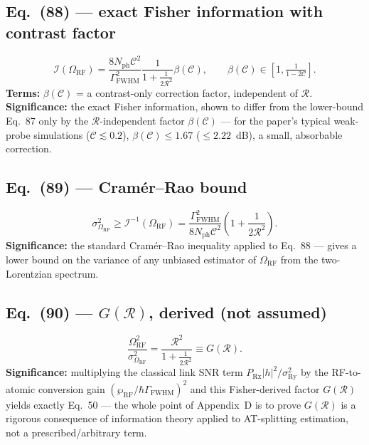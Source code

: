 \documentclass[11pt]{article}
\begin{document}
\subsection*{Eq.~(88) --- exact Fisher information with contrast factor}
\begin{equation}
\mathcal I(\Omega_\text{RF}) = \frac{8N_\text{ph}\mathcal C^2}{\Gamma_\text{FWHM}^2}\frac{1}{1+\frac{1}{2\mathcal R^2}}\beta(\mathcal C), \qquad \beta(\mathcal C)\in\left[1,\tfrac{1}{1-2\mathcal C}\right]. \tag{88}
\end{equation}
\textbf{Terms:} $\beta(\mathcal C)$ = a contrast-only correction factor,
independent of $\mathcal R$.
\textbf{Significance:} the exact Fisher information, shown to differ
from the lower-bound Eq.~87 only by the $\mathcal R$-independent factor
$\beta(\mathcal C)$ --- for the paper's typical weak-probe simulations
($\mathcal C\lesssim0.2$), $\beta(\mathcal C)\le1.67$ ($\le2.22$~dB), a
small, absorbable correction.

\subsection*{Eq.~(89) --- Cram\'er--Rao bound}
\begin{equation}
\sigma_{\Omega_\text{RF}}^2 \ge \mathcal I^{-1}(\Omega_\text{RF}) = \frac{\Gamma_\text{FWHM}^2}{8N_\text{ph}\mathcal C^2}\left(1+\frac{1}{2\mathcal R^2}\right). \tag{89}
\end{equation}
\textbf{Significance:} the standard Cram\'er--Rao inequality applied to
Eq.~88 --- gives a lower bound on the variance of any unbiased
estimator of $\Omega_\text{RF}$ from the two-Lorentzian spectrum.

\subsection*{Eq.~(90) --- $G(\mathcal R)$, derived (not assumed)}
\begin{equation}
\frac{\Omega_\text{RF}^2}{\sigma_{\Omega_\text{RF}}^2} = \frac{\mathcal R^2}{1+\frac{1}{2\mathcal R^2}} \equiv G(\mathcal R). \tag{90}
\end{equation}
\textbf{Significance:} multiplying the classical link SNR term
$P_\text{Rx}|h|^2/\sigma_\text{Ry}^2$ by the RF-to-atomic conversion
gain $(\wp_\text{RF}/\hbar\Gamma_\text{FWHM})^2$ and this Fisher-derived
factor $G(\mathcal R)$ yields exactly Eq.~50 --- the whole point of
Appendix~D is to prove $G(\mathcal R)$ is a rigorous consequence of
information theory applied to AT-splitting estimation, not a
prescribed/arbitrary term.
\end{document}

